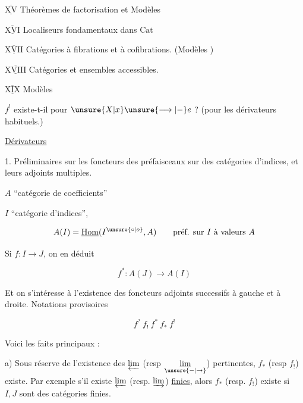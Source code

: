 $\overline{\underline{\mathrm{XV}}}$ Théorèmes de factorisation et Modèles 

$\overline{\underline{\mathrm{XVI}}}$ \;Localiseurs fondamentaux dans $\mathrm{Cat}$

$\overline{\underline{\mathrm{XVII}}}$ Catégories à fibrations et à cofibrations. (Modèles )

$\overline{\underline{\mathrm{XVIII}}}$ Catégories et ensembles accessibles.

$\overline{\underline{\mathrm{XIX}}}$ Modèles 




$f^{!}$ existe-t-il pour $\unsure{X|x}\unsure{\longrightarrow|-}e$ ? (pour les dérivateurs habituels.)


\uline{Dérivateurs}

1. Préliminaires sur les foncteurs   des préfaisceaux sur des catégories d'indices, et leurs adjoints multiples.

$A$ ``catégorie de coefficients''

$I$ ``catégorie d'indices'',

\[
A(I)=\underline{\mathrm{Hom}}(I^{\unsure{\circ|o}},A)\qquad\text{préf. sur }I\ \text{à valeurs }A
\]

Si $f:I\longrightarrow J$, on en déduit

\[
f^{*}:A(J)\longrightarrow A(I)
\]

Et on s'intéresse à l'existence des foncteurs adjoints successifs à gauche et à droite. Notations provisoires

\[
f^{?}\ f_{!}\ f^{*}\ f_{*}\ f^{!}
\]

Voici les faits principaux :

a) Sous réserve de l'existence des $\varprojlim$ (resp $\underset{\unsure{-|\to}}{\lim}$) pertinentes, $f_{*}$ (resp $f_{!}$) existe. Par exemple s'il existe $\varprojlim$ (resp. $\varinjlim$) \uline{finies}, alors $f_{*}$ (resp. $f_{!}$) existe si $I,J$ sont des catégories finies.

